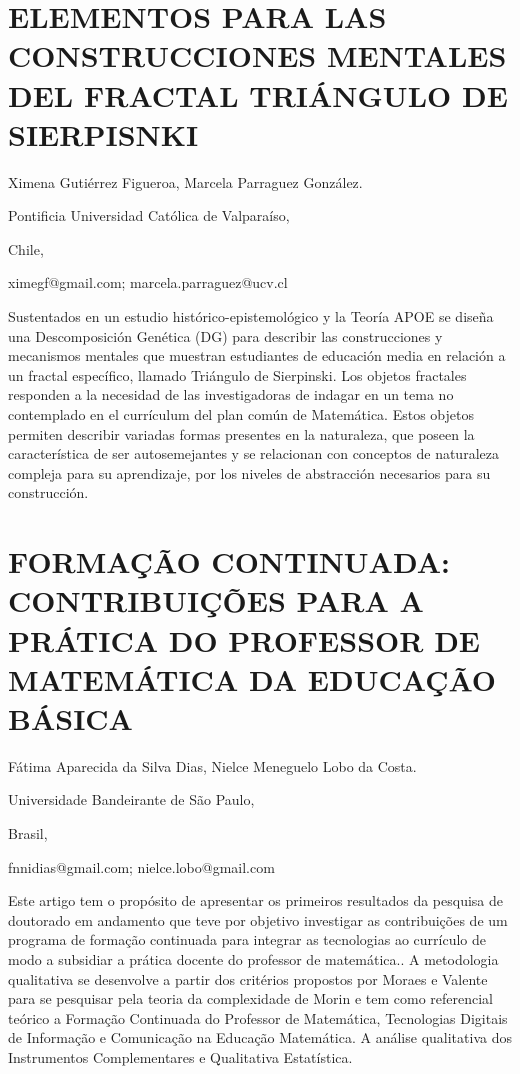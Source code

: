 \section{ELEMENTOS PARA LAS CONSTRUCCIONES MENTALES DEL FRACTAL TRIÁNGULO
DE SIERPISNKI}

\begin{datos}

Ximena Gutiérrez Figueroa, Marcela Parraguez González.

Pontificia Universidad Católica de Valparaíso,

Chile,

ximegf@gmail.com; marcela.parraguez@ucv.cl

\end{datos}

Sustentados en un estudio histórico-epistemológico y la Teoría APOE
se diseña una Descomposición Genética (DG) para describir las construcciones
y mecanismos mentales que muestran estudiantes de educación media
en relación a un fractal específico, llamado Triángulo de Sierpinski.
Los objetos fractales responden a la necesidad de las investigadoras
de indagar en un tema no contemplado en el currículum del plan común
de Matemática. Estos objetos permiten describir variadas formas presentes
en la naturaleza, que poseen la característica de ser autosemejantes
y se relacionan con conceptos de naturaleza compleja para su aprendizaje,
por los niveles de abstracción necesarios para su construcción.


\section{FORMAÇÃO CONTINUADA: CONTRIBUIÇÕES PARA A PRÁTICA DO PROFESSOR DE
MATEMÁTICA DA EDUCAÇÃO BÁSICA }

\begin{datos}

Fátima Aparecida da Silva Dias, Nielce Meneguelo Lobo da Costa.

Universidade Bandeirante de São Paulo,

Brasil,

fnnidias@gmail.com; nielce.lobo@gmail.com 

\end{datos} 

Este artigo tem o propósito de apresentar os primeiros resultados
da pesquisa de doutorado em andamento que teve por objetivo investigar
as contribuições de um programa de formação continuada para integrar
as tecnologias ao currículo de modo a subsidiar a prática docente
do professor de matemática.. A metodologia qualitativa se desenvolve
a partir dos critérios propostos por Moraes e Valente para se pesquisar
pela teoria da complexidade de Morin e tem como referencial teórico
a Formação Continuada do Professor de Matemática, Tecnologias Digitais
de Informação e Comunicação na Educação Matemática. A análise qualitativa
dos Instrumentos Complementares e Qualitativa Estatística.



